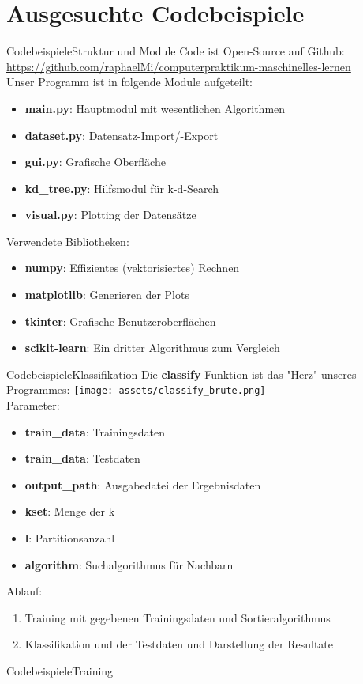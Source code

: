 \documentclass[9pt]{beamer}
\begin{document}
\section{Ausgesuchte Codebeispiele}
\begin{frame}{Codebeispiele}{Struktur und Module}
Code ist Open-Source auf Github: \url{https://github.com/raphaelMi/computerpraktikum-maschinelles-lernen}\\[0.4em]
Unser Programm ist in folgende Module aufgeteilt:
\begin{itemize}
\item{\textbf{main.py}: Hauptmodul mit wesentlichen Algorithmen}
\item{\textbf{dataset.py}: Datensatz-Import/-Export}
\item{\textbf{gui.py}: Grafische Oberfläche}
\item{\textbf{kd\_tree.py}: Hilfsmodul für k-d-Search}
\item{\textbf{visual.py}: Plotting der Datensätze}
\end{itemize}

Verwendete Bibliotheken:
\begin{itemize}
\item{\textbf{numpy}: Effizientes (vektorisiertes) Rechnen}
\item{\textbf{matplotlib}: Generieren der Plots}
\item{\textbf{tkinter}: Grafische Benutzeroberflächen}
\item{\textbf{scikit-learn}: Ein dritter Algorithmus zum Vergleich}
\end{itemize}
\end{frame}
\begin{frame}{Codebeispiele}{Klassifikation}
Die \textbf{classify}-Funktion ist das "Herz" unseres Programmes:
\texttt{[image: assets/classify\_brute.png]}\\[0.4em]
Parameter:
\begin{itemize}
\item{\textbf{train\_data}: Trainingsdaten}
\item{\textbf{train\_data}: Testdaten}
\item{\textbf{output\_path}: Ausgabedatei der Ergebnisdaten}
\item{\textbf{kset}: Menge der k}
\item{\textbf{l}: Partitionsanzahl}
\item{\textbf{algorithm}: Suchalgorithmus für Nachbarn}
\end{itemize}
Ablauf:
\begin{enumerate}[1.]
\item{Training mit gegebenen Trainingsdaten und Sortieralgorithmus}
\item{Klassifikation und der Testdaten und Darstellung der Resultate}
\end{enumerate}
\end{frame}

\begin{frame}{Codebeispiele}{Training}

\end{frame}
\end{document}
